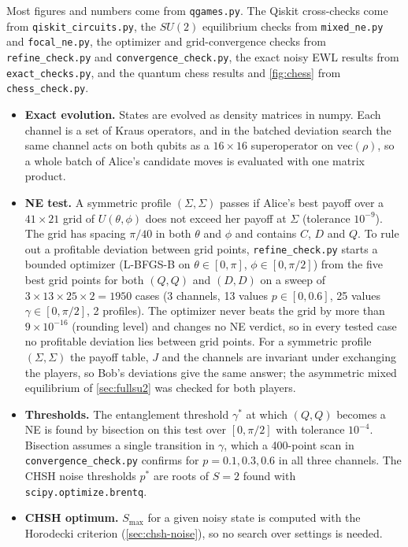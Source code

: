 \documentclass[11pt,a4paper]{article}
\begin{document}
Most figures and numbers come from \texttt{qgames.py}. The Qiskit cross-checks come from \texttt{qiskit\_circuits.py}, the $SU(2)$ equilibrium checks from \texttt{mixed\_ne.py} and \texttt{focal\_ne.py}, the optimizer and grid-convergence checks from \texttt{refine\_check.py} and \texttt{convergence\_check.py}, the exact noisy EWL results from \texttt{exact\_checks.py}, and the quantum chess results and \cref{fig:chess} from \texttt{chess\_check.py}.
\begin{itemize}
\item \textbf{Exact evolution.} States are evolved as density matrices in numpy. Each channel is a set of Kraus operators, and in the batched deviation search the same channel acts on both qubits as a $16\times16$ superoperator on $\mathrm{vec}(\rho)$, so a whole batch of Alice's candidate moves is evaluated with one matrix product.
\item \textbf{NE test.} A symmetric profile $(\Sigma,\Sigma)$ passes if Alice's best payoff over a $41\times21$ grid of $U(\theta,\phi)$ does not exceed her payoff at $\Sigma$ (tolerance $10^{-9}$). The grid has spacing $\pi/40$ in both $\theta$ and $\phi$ and contains $C$, $D$ and $Q$. To rule out a profitable deviation between grid points, \texttt{refine\_check.py} starts a bounded optimizer (L-BFGS-B on $\theta\in[0,\pi]$, $\phi\in[0,\pi/2]$) from the five best grid points for both $(Q,Q)$ and $(D,D)$ on a sweep of $3\times13\times25\times2=1950$ cases (3 channels, 13 values $p\in[0,0.6]$, 25 values $\gamma\in[0,\pi/2]$, 2 profiles). The optimizer never beats the grid by more than $9\times10^{-16}$ (rounding level) and changes no NE verdict, so in every tested case no profitable deviation lies between grid points. For a symmetric profile $(\Sigma,\Sigma)$ the payoff table, $J$ and the channels are invariant under exchanging the players, so Bob's deviations give the same answer; the asymmetric mixed equilibrium of \cref{sec:fullsu2} was checked for both players.
\item \textbf{Thresholds.} The entanglement threshold $\gamma^*$ at which $(Q,Q)$ becomes a NE is found by bisection on this test over $[0,\pi/2]$ with tolerance $10^{-4}$. Bisection assumes a single transition in $\gamma$, which a 400-point scan in \texttt{convergence\_check.py} confirms for $p=0.1,0.3,0.6$ in all three channels. The CHSH noise thresholds $p^*$ are roots of $S=2$ found with \texttt{scipy.optimize.brentq}.
\item \textbf{CHSH optimum.} $S_{\max}$ for a given noisy state is computed with the Horodecki criterion (\cref{sec:chsh-noise}), so no search over settings is needed.

\end{itemize}
\end{document}
